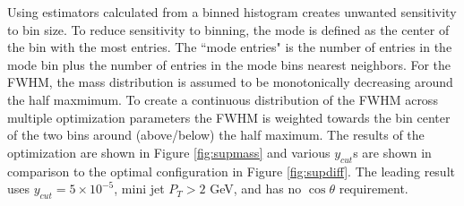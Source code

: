 Using estimators calculated from a binned histogram creates unwanted sensitivity to bin size. To reduce sensitivity to binning, the mode is defined as the center of the bin with the most entries. The ``mode entries" is the number of entries in the mode bin plus the number of entries in the mode bins nearest neighbors. For the FWHM, the mass distribution is assumed to be monotonically decreasing around the half maxmimum. To create a continuous distribution of the FWHM across multiple optimization parameters the FWHM is weighted towards the bin center of the two bins around (above/below) the half maximum. The results of the optimization are shown in Figure \ref{fig:supmass} and various $y_{cut}$s are shown in comparison to the optimal configuration in Figure \ref{fig:supdiff}. The leading result uses $y_{cut} = 5\times 10^{-5}$, mini jet $P_T > 2$ GeV, and has no $\cos \theta$ requirement. 

